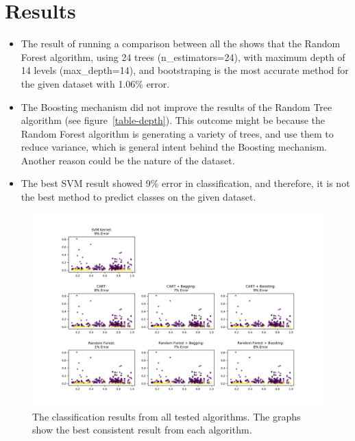 \documentclass[10pt,twocolumn]{article}
\begin{document}
\section{Results}
\begin{itemize}
  \item The result of running a comparison between all the shows that the Random Forest algorithm, using 24 trees (n\_estimators=24), with maximum depth of 14 levels (max\_depth=14), and bootstraping is the most accurate method for the given dataset with 1.06\% error.
  \item The Boosting mechanism did not improve the results of the Random Tree algorithm (see figure~\ref{table-depth}). This outcome might be because the Random Forest algorithm is generating a variety of trees, and use them to reduce variance, which is general intent behind the Boosting mechanism. Another reason could be the nature of the dataset.
  \item The best SVM result showed 9\% error in classification, and therefore, it is not the best method to predict classes on the given dataset.
\end{itemize}



\begin{figure}[!b]
  \begin{center}
    \includegraphics[width=5.75in]{../plots/02.png}
  \end{center}
  \caption{\small The classification results from all tested algorithms. The graphs show the best consistent result from each algorithm.}
  \label{classes}
\end{figure}
\end{document}
